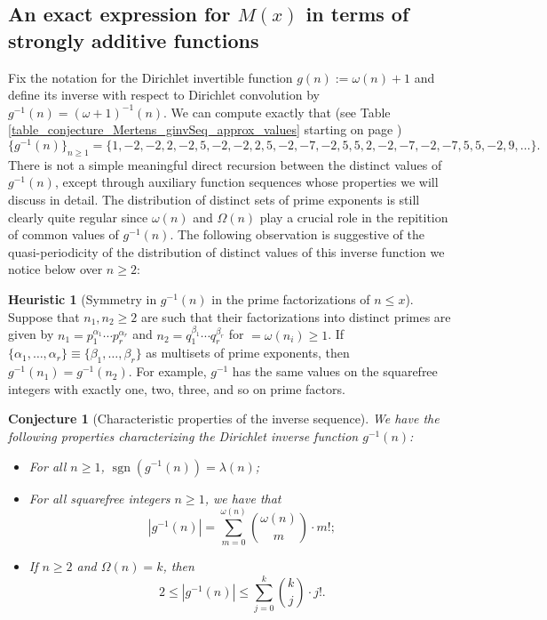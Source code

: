 \documentclass[11pt,reqno,a4letter]{article}
\numberwithin{figure}{section}
\numberwithin{table}{section}
\theoremstyle{plain}
\newtheorem{conjecture}[theorem]{Conjecture}
\numberwithin{theorem}{section}
\theoremstyle{definition}
\newtheorem{heuristic}[theorem]{Heuristic}
\newcommand{\NBRef}[1]{}
\begin{document}
\subsection{An exact expression for $M(x)$ in terms of strongly additive functions} 
\label{example_InvertingARecRelForMx_Intro}

Fix the notation for the Dirichlet invertible function $g(n) := \omega(n) + 1$ and define its 
inverse with respect to Dirichlet convolution by $g^{-1}(n) = (\omega+1)^{-1}(n)$. 
We can compute exactly that 
(see Table \ref{table_conjecture_Mertens_ginvSeq_approx_values} starting on page 
\pageref{table_conjecture_Mertens_ginvSeq_approx_values}) 
\[
\{g^{-1}(n)\}_{n \geq 1} = \{1, -2, -2, 2, -2, 5, -2, -2, 2, 5, -2, -7, -2, 5, 5, 2, -2, -7, -2, 
     -7, 5, 5, -2, 9, \ldots \}. 
\] 
There is not a simple meaningful 
direct recursion between the distinct values of $g^{-1}(n)$, except 
through auxiliary function sequences whose properties we will discuss in detail. 
The distribution of distinct sets of prime exponents is still clearly quite regular since 
$\omega(n)$ and $\Omega(n)$ play a crucial role in the repitition of common values of 
$g^{-1}(n)$. 
The following observation is suggestive of the quasi-periodicity of the distribution of 
distinct values of this inverse function we notice below over $n \geq 2$: 

\begin{heuristic}[Symmetry in $g^{-1}(n)$ in the prime factorizations of $n \leq x$] 
\label{heuristic_SymmetryIngInvFuncs} 
Suppose that $n_1, n_2 \geq 2$ are such that their factorizations into distinct primes are 
given by $n_1 = p_1^{\alpha_1} \cdots p_r^{\alpha_r}$ and $n_2 = q_1^{\beta_1} \cdots q_r^{\beta_r}$ 
for $ = \omega(n_i) \geq 1$. 
If $\{\alpha_1, \ldots, \alpha_r\} \equiv \{\beta_1, \ldots, \beta_r\}$ as multisets of prime exponents, 
then $g^{-1}(n_1) = g^{-1}(n_2)$. For example, $g^{-1}$ has the same values on the squarefree integers 
with exactly one, two, three, and so on prime factors.  
\end{heuristic} 

\NBRef{A01-2020-04-26}
\begin{conjecture}[Characteristic properties of the inverse sequence] 
\label{lemma_gInv_MxExample} 
We have the following properties characterizing the 
Dirichlet inverse function $g^{-1}(n)$: 
\begin{itemize} 

\item[\textbf{(A)}] For all $n \geq 1$, $\operatorname{sgn}(g^{-1}(n)) = \lambda(n)$; 
\item[\textbf{(B)}] For all squarefree integers $n \geq 1$, we have that 
     \[
     |g^{-1}(n)| = \sum_{m=0}^{\omega(n)} \binom{\omega(n)}{m} \cdot m!; 
     \]
\item[\textbf{(C)}] If $n \geq 2$ and $\Omega(n) = k$, then 
     \[
     2 \leq |g^{-1}(n)| \leq \sum_{j=0}^{k} \binom{k}{j} \cdot j!. 
     \]
\end{itemize} 
\end{conjecture} 
\end{document}
